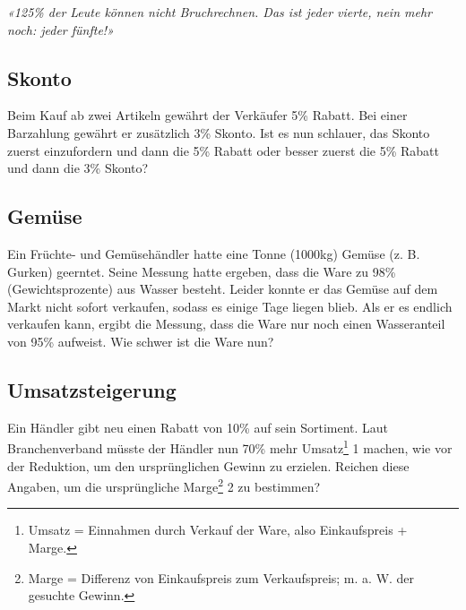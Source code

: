 \begin{center}\textit{«125\% der Leute können nicht Bruchrechnen. Das ist jeder vierte, nein mehr
noch: jeder fünfte!»}\end{center}


\subsection{Skonto}

Beim Kauf ab zwei Artikeln gewährt der Verkäufer 5\% Rabatt. Bei einer
Barzahlung gewährt er zusätzlich 3\% Skonto. Ist es nun schlauer, das Skonto
zuerst einzufordern und dann die 5\% Rabatt oder besser zuerst die 5\% Rabatt
und dann die 3\% Skonto?

\TNTeop{}

\subsection{Gemüse}
Ein Früchte- und Gemüsehändler hatte eine Tonne (1000kg) Gemüse (z. B.
Gurken) geerntet. Seine Messung hatte ergeben, dass die Ware zu 98\%\,
(Gewichtsprozente) aus Wasser besteht.
Leider konnte er das Gemüse auf dem Markt nicht sofort verkaufen, sodass es
einige Tage liegen blieb. Als er es endlich verkaufen kann, ergibt die Messung,
dass die Ware nur noch einen Wasseranteil von 95\% aufweist.
Wie schwer ist die Ware nun?

\TNTeop{}

\subsection{Umsatzsteigerung}
Ein Händler gibt neu einen Rabatt von 10\% auf sein Sortiment. Laut
Branchenverband müsste der Händler nun 70\% mehr Umsatz\footnote{Umsatz = Einnahmen durch Verkauf der Ware, also Einkaufspreis + Marge.} 1 machen, wie vor
der Reduktion, um den ursprünglichen Gewinn zu erzielen.
Reichen diese Angaben, um die ursprüngliche Marge\footnote{Marge = Differenz von Einkaufspreis zum Verkaufspreis; m. a. W. der gesuchte
Gewinn.} 2 zu bestimmen?

\TNTeop{}


